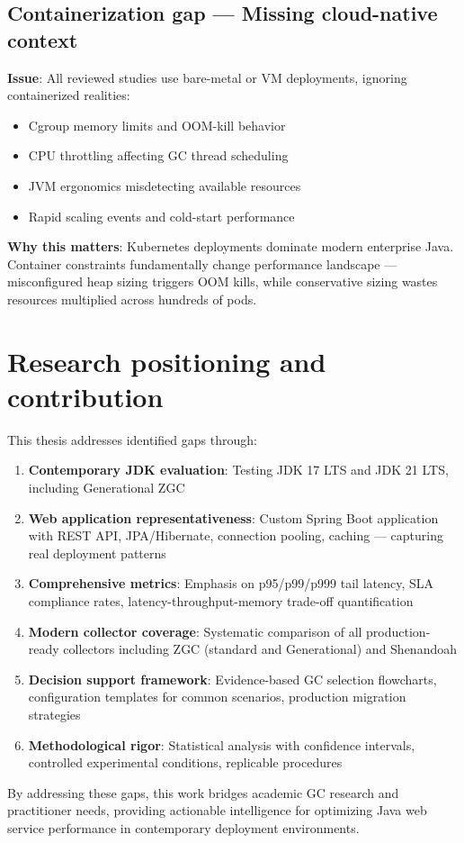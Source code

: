 \subsection{Containerization gap --- Missing cloud-native context}
\label{subsec:gap-container}
\textbf{Issue}: All reviewed studies use bare-metal or VM deployments, ignoring containerized realities:
\begin{itemize}
\item Cgroup memory limits and OOM-kill behavior
\item CPU throttling affecting GC thread scheduling
\item JVM ergonomics misdetecting available resources
\item Rapid scaling events and cold-start performance
\end{itemize}
\textbf{Why this matters}: Kubernetes deployments dominate modern enterprise Java. Container constraints fundamentally change performance landscape --- misconfigured heap sizing triggers OOM kills, while conservative sizing wastes resources multiplied across hundreds of pods.
\section{Research positioning and contribution}
\label{sec:positioning}
This thesis addresses identified gaps through:
\begin{enumerate}
\item \textbf{Contemporary JDK evaluation}: Testing JDK 17 LTS and JDK 21 LTS, including Generational ZGC
\item \textbf{Web application representativeness}: Custom Spring Boot application with REST API, JPA/Hibernate, connection pooling, caching --- capturing real deployment patterns

\item \textbf{Comprehensive metrics}: Emphasis on p95/p99/p999 tail latency, SLA compliance rates, latency-throughput-memory trade-off quantification

\item \textbf{Modern collector coverage}: Systematic comparison of all production-ready collectors including ZGC (standard and Generational) and Shenandoah

\item \textbf{Decision support framework}: Evidence-based GC selection flowcharts, configuration templates for common scenarios, production migration strategies

\item \textbf{Methodological rigor}: Statistical analysis with confidence intervals, controlled experimental conditions, replicable procedures
\end{enumerate}
By addressing these gaps, this work bridges academic GC research and practitioner needs, providing actionable intelligence for optimizing Java web service performance in contemporary deployment environments.